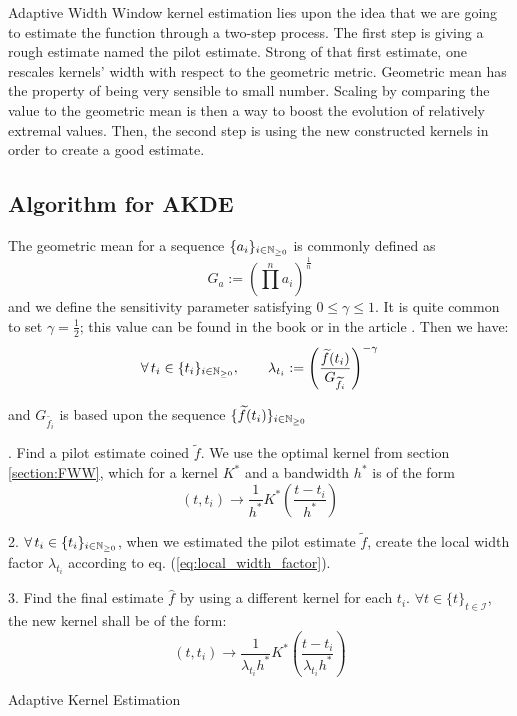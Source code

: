 \documentclass[11pt]{book}
\newcommand{\sequence}[1]{\{ #1 \}_{ i \in \N} }
\newcommand{\sequencetime}{\{t\}_{t \in \mathcal I} }
\begin{document}
Adaptive Width Window kernel estimation lies upon the idea that we are going to estimate the function through a two-step process. The first step is giving a rough estimate named the pilot estimate. Strong of that first estimate, one rescales kernels' width with respect to the geometric metric. Geometric mean has the property of being very sensible to small number. Scaling by comparing the value to the geometric mean is then a way to boost the evolution of relatively extremal values. 
Then, the second step is using the new constructed kernels in order to create a good estimate.



\subsection{Algorithm for AKDE}
\label{section:algo_awke}
The geometric mean for a sequence $\sequence{ a_i } $ is commonly defined as $$ G_{a} := \left (  \prod^n a_i \right  )^{\frac 1 n }$$ and we define the sensitivity parameter satisfying $ 0 \leq \gamma \leq 1$. It is quite common to set $\gamma = \frac 1 2$; this value can be found in the book \cite{Silverman} or in the article \cite{abramson}. Then we have:
\begin{equation}
\label{eq:local_width_factor}
\forall t_i \in \sequence{t_i}, \qquad \lambda_{t_i} :=  \left ( \frac{\widetilde{f}(t_i) }{G_{\widetilde{f_i}} } \right ) ^{ - \gamma }  
\end{equation}

and  $ G_{\widetilde{f_i}} $ is based upon the sequence $ \sequence{ \widetilde{f}(t_i) } $






\begin{algorithm}[H]
\label{algo:adaptive1}
. \quad Find a pilot estimate coined $\widetilde{f}$. We use the optimal kernel from section \ref{section:FWW}, which for a kernel $K^*$ and a bandwidth $h^*$ is of the form $$ (t, t_i) \to \frac 1 {h^*} K^* \left ( \frac{t - t_i}{h^*} \right ) $$ 

2. \quad $\forall t_i \in \sequence{t_i}$, when we estimated the pilot estimate $\widetilde{f}$, create the local width factor $\lambda_{t_i}$ according to eq. (\ref{eq:local_width_factor}). 

3. \quad Find the final estimate $\hat{f}$ by using a different kernel for each $t_i$. $\forall t \in \sequencetime $, the new kernel shall be of the form:
$$ (t, t_i) \to \frac 1 {\lambda_{t_i} h^*} K^* \left ( \frac{t - t_i}{\lambda_{t_i} h^*} \right )$$ 
\caption{Adaptive Kernel Estimation}
\end{algorithm}
\end{document}
